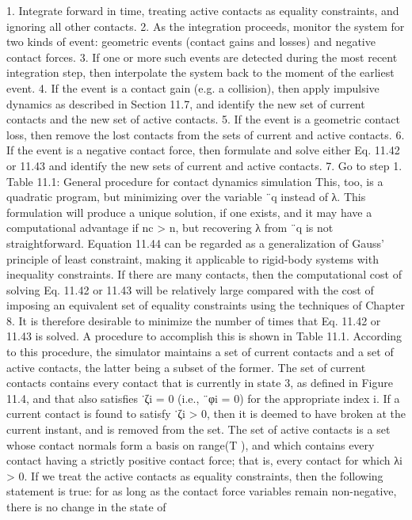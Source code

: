 1. Integrate forward in time, treating active contacts as equality constraints, and ignoring all other contacts. 2. As the integration proceeds, monitor the system for two kinds of event: geometric events (contact gains and losses) and negative contact forces. 3. If one or more such events are detected during the most recent integration step, then interpolate the system back to the moment of the earliest event. 4. If the event is a contact gain (e.g. a collision), then apply impulsive dynamics as described in Section 11.7, and identify the new set of current contacts and the new set of active contacts. 5. If the event is a geometric contact loss, then remove the lost contacts from the sets of current and active contacts. 6. If the event is a negative contact force, then formulate and solve either Eq. 11.42 or 11.43 and identify the new sets of current and active contacts. 7. Go to step 1. Table 11.1: General procedure for contact dynamics simulation This, too, is a quadratic program, but minimizing over the variable ¨q instead of λ. This formulation will produce a unique solution, if one exists, and it may have a computational advantage if nc > n, but recovering λ from ¨q is not straightforward. Equation 11.44 can be regarded as a generalization of Gauss’ principle of least constraint, making it applicable to rigid-body systems with inequality constraints. If there are many contacts, then the computational cost of solving Eq. 11.42 or 11.43 will be relatively large compared with the cost of imposing an equivalent set of equality constraints using the techniques of Chapter 8. It is therefore desirable to minimize the number of times that Eq. 11.42 or 11.43 is solved. A procedure to accomplish this is shown in Table 11.1. According to this procedure, the simulator maintains a set of current contacts and a set of active contacts, the latter being a subset of the former. The set of current contacts contains every contact that is currently in state 3, as defined in Figure 11.4, and that also satisfies ˙ζi = 0 (i.e., ¨φi = 0) for the appropriate index i. If a current contact is found to satisfy ˙ζi > 0, then it is deemed to have broken at the current instant, and is removed from the set. The set of active contacts is a set whose contact normals form a basis on range(T ), and which contains every contact having a strictly positive contact force; that is, every contact for which λi > 0. If we treat the active contacts as equality constraints, then the following statement is true: for as long as the contact force variables remain non-negative, there is no change in the state of

